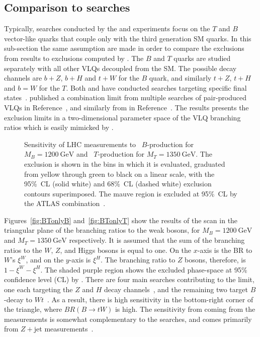 \subsection{Comparison to \ATLAS searches}
Typically, searches conducted by the \ATLAS and \CMS experiments focus on the $T$ and $B$ vector-like quarks that couple only with the third generation SM quarks. In this sub-section the same assumption are made in order to compare the exclusions from \LHC results to exclusions computed by \contur. The $B$ and $T$ quarks are studied separately with all other VLQs decoupled from the SM. The possible decay channels are $b + Z$, $b + H$ and $t + W$ for the $B$ quark, and similarly $t + Z$, $t + H$ and $b = W$ for the $T$. Both \ATLAS and \CMS have conducted searches targeting specific final states~. \ATLAS published a combination limit from multiple searches of pair-produced VLQs in Reference~\cite{ATLAS_VLQ_combination}, and similarly from \CMS in Reference~\cite{Sirunyan_2018}. The \ATLAS results presents the exclusion limits in a two-dimensional parameter space of the VLQ branching ratios which is easily mimicked by \contur.
\begin{figure}[tbp]
    \vspace{-0.4cm}
    \caption{Sensitivity of LHC measurements to
    \protect{}~$B$-production for $M_B = \SI{1200}{\GeV}$ and
    \protect{}~$T$-production for $M_T = \SI{1350}{\GeV}$.
    The \contur exclusion is shown in the bins in which it is evaluated,
    graduated from yellow through green to black on a linear scale, with the 95\%~CL (solid white)
    and 68\%~CL (dashed white) exclusion contours superimposed. The mauve region
    is excluded at 95\%~CL by the ATLAS combination~\cite{Aaboud:2018pii}.}
    \label{fig:BTonly}
\end{figure}

Figures~\ref{fig:BTonlyB} and~\ref{fig:BTonlyT} show the results of the \contur scan in the triangular plane of the branching ratios to the weak bosons, for $M_B = \SI{1200}{\GeV}$ and $M_T = \SI{1350}{\GeV}$ respectively. It is assumed that the sum of the branching ratios to the $W$, $Z$, and Higgs bosons is equal to one. On the $x$-axis is the BR to $W$'s $\xi^W$, and on the $y$-axis is $\xi^H$. The branching ratio to $Z$ bosons, therefore, is $1-\xi^W-\xi^H$. The shaded purple region shows the excluded phase-space at 95\% confidence level (CL) by \ATLAS. There are four main searches contributing to the \ATLAS limit, one each targeting the $Z$ and $H$ decay channels~\cite{ZllSearch,HadSearch}, and the remaining two target $B$-decay to $Wt$~\cite{WtSearch,TriLepSearch}. As a result, there is high sensitivity in the bottom-right corner of the triangle, where $BR(B\rightarrow tW)$ is high. The sensitivity from \contur coming from the measurements is somewhat complementary to the searches, and comes primarily from $Z+$jet measurements~\cite{Aad:2015auj,Aaboud:2017hox,Aaboud:2017hbk,Aaboud:2019jcc}.


